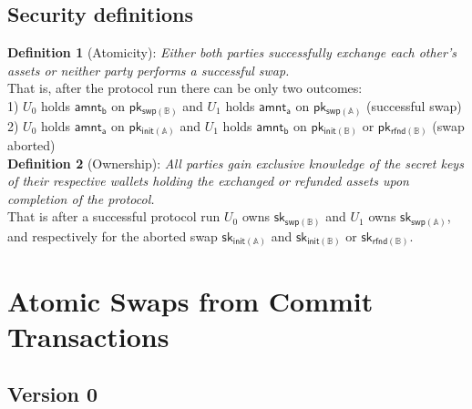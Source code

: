 \documentclass{article}      	%
\begin{document}
\subsection{Security definitions}

\textbf{Definition 1} (Atomicity): \textit{Either both parties successfully exchange each other's assets or neither party performs a successful swap.}
\vspace{0.5em}
\\
That is, after the protocol run there can be only two outcomes: \\
1) $U_0$ holds $\mathsf{amnt_b}$ on $\mathsf{pk_{swp(\mathbb{B})}}$ and $U_1$ holds $\mathsf{amnt_a}$ on $\mathsf{pk_{swp(\mathbb{A})}}$ (successful swap) \\
2) $U_0$ holds $\mathsf{amnt_a}$ on $\mathsf{pk_{init(\mathbb{A})}}$ and $U_1$ holds $\mathsf{amnt_b}$ on $\mathsf{pk_{init(\mathbb{B})}}$ or $\mathsf{pk_{rfnd(\mathbb{B})}}$ (swap aborted) \\

\textbf{Definition 2} (Ownership): \textit{All parties gain exclusive knowledge of the secret keys of their respective wallets holding the exchanged or refunded assets upon completion of the protocol.} 
\vspace{0.5em}
\\
That is after a successful protocol run $U_0$ owns $\mathsf{sk_{swp(\mathbb{B})}}$ and $U_1$ owns $\mathsf{sk_{swp(\mathbb{A})}}$, and respectively for the aborted swap  $\mathsf{sk_{init(\mathbb{A})}}$ and $\mathsf{sk_{init(\mathbb{B})}}$ or $\mathsf{sk_{rfnd(\mathbb{B})}}$. \\


\section{Atomic Swaps from Commit Transactions}







\subsection{Version 0}
\end{document}

